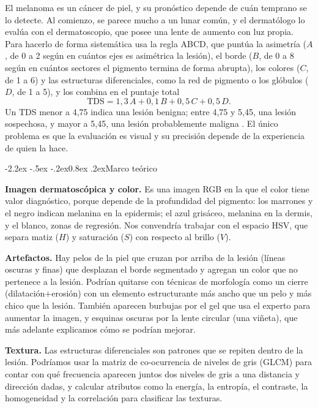 \documentclass[11pt,a4paper]{article}
\makeatletter
\renewcommand\subsection{\@startsection{subsection}{2}{\z@}%
  {-2.2ex \@plus -.5ex \@minus -.2ex}{0.8ex \@plus .2ex}{\normalfont\normalsize\bfseries}}
\makeatother
\begin{document}
El melanoma es un cáncer de piel, y su pronóstico depende de cuán
temprano se lo detecte. Al comienzo, se parece mucho a un lunar común, y
el dermatólogo lo evalúa con el dermatoscopio, que posee una lente de
aumento con luz propia. Para hacerlo de forma sistemática usa la regla
ABCD, que puntúa la asimetría ($A$, de 0 a 2 según en cuántos ejes es
asimétrica la lesión), el borde ($B$, de 0 a 8 según en cuántos sectores
el pigmento termina de forma abrupta), los colores ($C$, de 1 a 6) y las
estructuras diferenciales, como la red de pigmento o los glóbulos ($D$,
de 1 a 5), y los combina en el puntaje total
\[
\mathrm{TDS} = 1{,}3\,A + 0{,}1\,B + 0{,}5\,C + 0{,}5\,D.
\]
Un TDS menor a 4,75 indica una lesión benigna; entre 4,75 y 5,45, una
lesión sospechosa, y mayor a 5,45, una lesión probablemente maligna
\cite{nachbar}. El único problema es que la evaluación es visual y su
precisión depende de la experiencia de quien la hace.

\subsection{Marco teórico}

\textbf{Imagen dermatoscópica y color.} Es una imagen RGB en la que el
color tiene valor diagnóstico, porque depende de la profundidad del
pigmento: los marrones y el negro indican melanina en la epidermis; el
azul grisáceo, melanina en la dermis, y el blanco, zonas de regresión.
Nos convendría trabajar con el espacio HSV, que separa matiz ($H$) y
saturación ($S$) con respecto al brillo ($V$).

\textbf{Artefactos.} Hay pelos de la piel que cruzan por arriba de la
lesión (líneas oscuras y finas) que desplazan el borde segmentado y
agregan un color que no pertenece a la lesión. Podrían quitarse con
técnicas de morfología como un cierre (dilatación+erosión) con un
elemento estructurante más ancho que un pelo y más chico que la lesión.
También aparecen burbujas por el gel que usa el experto para aumentar la
imagen, y esquinas oscuras por la lente circular (una viñeta), que más
adelante explicamos cómo se podrían mejorar.

\textbf{Textura.} Las estructuras diferenciales son patrones que se
repiten dentro de la lesión. Podríamos usar la matriz de co-ocurrencia
de niveles de gris (GLCM) para contar con qué frecuencia aparecen juntos
dos niveles de gris a una distancia y dirección dadas, y calcular
atributos como la energía, la entropía, el contraste, la homogeneidad y
la correlación para clasificar las texturas.
\end{document}
